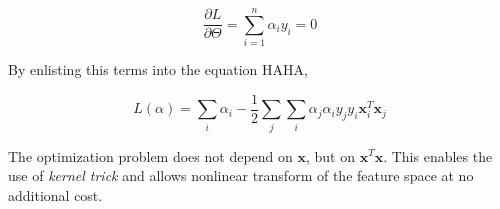 \documentclass{article}
\begin{document}
\begin{equation} 
\frac{\partial L}{\partial \Theta} = \sum_{i=1}^n \alpha_i y_i = 0
\end{equation}

By enlisting this terms into the equation HAHA, 

\begin{equation} 
L(\alpha) = \sum_i \alpha_i - \frac{1}{2} \sum_j \sum_i \alpha_j \alpha_i y_j y_i \mathbf{x}_i^T \mathbf{x}_j
\end{equation}


The optimization problem does not depend on $\mathbf{x}$, but on $\mathbf{x}^T\mathbf{x}$. This enables the use of \emph{kernel trick} and allows nonlinear transform of the feature space at no additional cost. 
\end{document}
